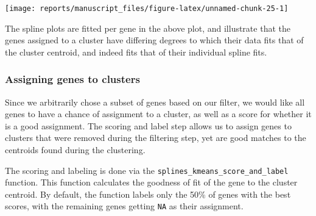 \documentclass[9pt,a4paper,]{extarticle}
\newenvironment{Shaded}{\begin{snugshade}}{\end{snugshade}}
\newcommand{\CommentTok}[1]{\textcolor[rgb]{0.56,0.35,0.01}{\textit{#1}}}
\newcommand{\KeywordTok}[1]{\textcolor[rgb]{0.13,0.29,0.53}{\textbf{#1}}}
\newcommand{\NormalTok}[1]{#1}
\newcommand{\OperatorTok}[1]{\textcolor[rgb]{0.81,0.36,0.00}{\textbf{#1}}}
\newcommand{\StringTok}[1]{\textcolor[rgb]{0.31,0.60,0.02}{#1}}
\begin{document}
\begin{center}\texttt{[image: reports/manuscript\_files/figure-latex/unnamed-chunk-25-1]} \end{center}

The spline plots are fitted per gene in the above plot, and illustrate that
the genes assigned to a cluster have differing degrees to which their data
fits that of the cluster centroid, and indeed fits that of their individual
spline fits.

\hypertarget{assigning-genes-to-clusters}{%
\subsubsection{Assigning genes to clusters}\label{assigning-genes-to-clusters}}

Since we arbitrarily chose a subset of genes based on our filter, we would
like all genes to have a chance of assignment to a cluster, as well as a score
for whether it is a good assignment. The scoring and label step allows us to
assign genes to clusters that were removed during the filtering step, yet are
good matches to the centroids found during the clustering.

The scoring and labeling is done via the \texttt{splines\_kmeans\_score\_and\_label}
function. This function calculates the goodness of fit of the gene to the
cluster centroid. By default, the function labels only the 50\% of genes with
the best scores, with the remaining genes getting \texttt{NA} as their assignment.

\begin{Shaded}
\end{Shaded}
\end{document}
